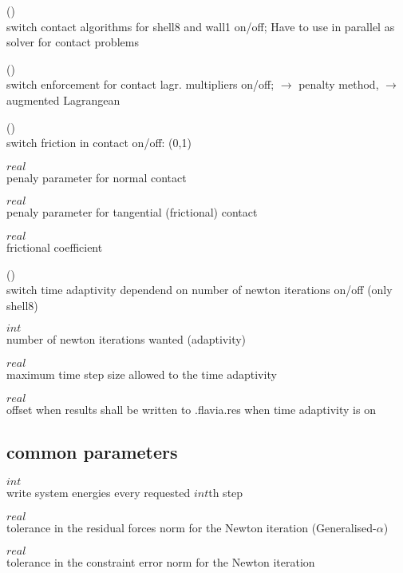  (\kor{})\\
switch contact algorithms for shell8 and wall1 on/off;
Have to use  in parallel as solver for contact problems

 (\kor{})\\
switch enforcement for contact lagr. multipliers on/off;
 $\to$ penalty method,  $\to$ augmented Lagrangean

 (\kor{})\\
switch friction in contact on/off: (0,1)

 $real$\\
penaly parameter for normal contact

 $real$\\
penaly parameter for tangential (frictional) contact

 $real$\\
frictional coefficient

 (\kor{})\\
switch time adaptivity dependend on number of newton iterations on/off (only shell8)

 $int$\\
number of newton iterations wanted (adaptivity)

 $real$\\
maximum time step size allowed to the time adaptivity

 $real$\\
offset when results shall be written to .flavia.res when time adaptivity is on

\subsection{\baci{} common parameters}

 $int$\\
write system energies every requested $int$th step

 $real$\\
tolerance in the residual forces norm for the Newton iteration (Generalised-$\alpha$)

 $real$\\
tolerance in the constraint error norm for the Newton iteration

